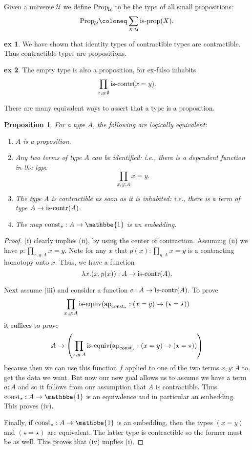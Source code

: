 \documentclass{amsart}
\theoremstyle{theorem}
\newtheorem*{prop}{Proposition}
\theoremstyle{definition}
\newtheorem*{ex}{ex}
\theoremstyle{remark}
\newcommand{\0}{\mathbbe{0}}
\newcommand{\1}{\mathbbe{1}}
\newcommand{\2}{\mathbbe{2}}
\newcommand{\3}{\mathbbe{3}}
\newcommand{\4}{\mathbbe{4}}
\newcommand{\term}[1]{{\textup{#1}}}
\newcommand{\type}[1]{{\textup{#1}}}
\newcommand{\ap}{\term{ap}}
\newcommand{\UU}{{\mathcal{U}}}
\newcommand{\iscontr}{\type{is-contr}}
\newcommand{\isprop}{\type{is-prop}}
\newcommand{\isequiv}{\type{is-equiv}}
\newcommand{\Prop}{\type{Prop}_{\UU}}
\begin{document}
Given a universe $\UU$ we define $\Prop$ to be the type of all small propositions:
\[ \Prop \coloneq \sum_{X: \UU}\isprop(X).\]

\begin{ex} We have shown that identity types of contractible types are contractible. Thus contractible types are propositions.
\end{ex}

\begin{ex} The empty type is also a proposition, for ex-falso inhabits
\[ \prod_{x,y: \emptyset} \iscontr(x=y).\]
\end{ex}

There are many equivalent ways to assert that a type is a proposition.

\begin{prop} For a type $A$, the following are logically equivalent:
\begin{enumerate}
\item $A$ is a proposition.
\item Any two terms of type $A$ can be identified: i.e., there is a dependent function in the type
\[ \prod_{x,y:A} x=y.\]
\item The type $A$ is contractible as soon as it is inhabited: i.e., there is a term of type $A \to \iscontr(A)$.
\item The map $\term{const}_\star : A \to \1$ is an embedding.
\end{enumerate}
\end{prop}
\begin{proof}
(i) clearly implies (ii), by using the center of contraction. Assuming (ii) we have $p : \prod_{x,y:A} x= y$. Note for any $x$ that $p(x) : \prod_{y :A} x=y$ is a contracting homotopy onto $x$. Thus, we have a function
\[ \lambda x. (x,p(x)) : A \to \iscontr(A).\]

Next assume (iii) and consider a function $c : A\to \iscontr(A)$. To prove
\[ \prod_{x,y :A} \isequiv (\ap_{\term{const}_\star} : (x=y) \to (\star = \star))\] it suffices to prove
\[ A \to \left(\prod_{x,y :A} \isequiv (\ap_{\term{const}_\star} : (x=y) \to (\star = \star))\right)\]
because then we can use this function $f$ applied to one of the two terms $x,y : A$ to get the data we want. But now our new goal allows us to assume we have a term $a:A$ and so it follows from our assumption that $A$ is contractible. Thus $\term{const}_\star : A \to \1$ is an equivalence and in particular an embedding. This proves (iv).

Finally, if $\term{const}_\star : A \to \1$ is an embedding, then the types $(x=y)$ and $(\star=\star)$ are equivalent. The latter type is contractible so the former must be as well. This proves that (iv) implies (i).
\end{proof}
\end{document}
